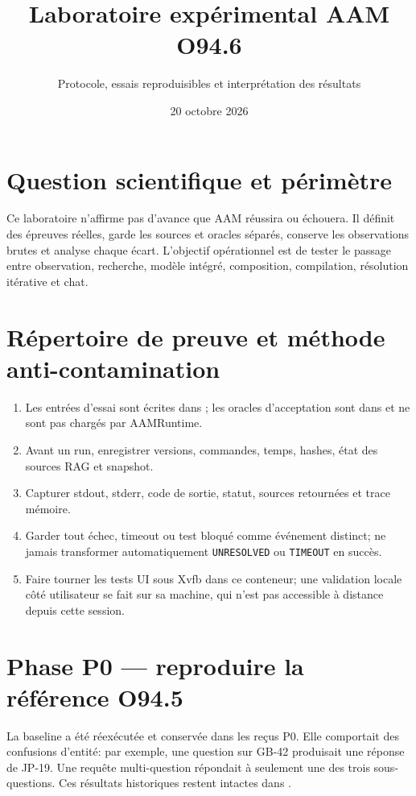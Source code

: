 \documentclass[11pt,a4paper]{article}
\title{Laboratoire expérimental AAM O94.6}
\author{Protocole, essais reproduisibles et interprétation des résultats}
\date{20 octobre 2026}
\begin{document}
\maketitle
\tableofcontents
\section{Question scientifique et périmètre}
Ce laboratoire n'affirme pas d'avance que AAM réussira ou échouera. Il définit des épreuves réelles, garde les sources et oracles séparés, conserve les observations brutes et analyse chaque écart. L'objectif opérationnel est de tester le passage entre observation, recherche, modèle intégré, composition, compilation, résolution itérative et chat.

\section{Répertoire de preuve et méthode anti-contamination}
\begin{enumerate}[leftmargin=1.5em]
\item Les entrées d'essai sont écrites dans ; les oracles d'acceptation sont dans  et ne sont pas chargés par AAMRuntime.
\item Avant un run, enregistrer versions, commandes, temps, hashes, état des sources RAG et snapshot.
\item Capturer stdout, stderr, code de sortie, statut, sources retournées et trace mémoire.
\item Garder tout échec, timeout ou test bloqué comme événement distinct; ne jamais transformer automatiquement \texttt{UNRESOLVED} ou \texttt{TIMEOUT} en succès.
\item Faire tourner les tests UI sous Xvfb dans ce conteneur; une validation locale côté utilisateur se fait sur sa machine, qui n'est pas accessible à distance depuis cette session.
\end{enumerate}

\section{Phase P0 — reproduire la référence O94.5}
La baseline a été réexécutée et conservée dans les reçus P0. Elle comportait des confusions d'entité: par exemple, une question sur GB-42 produisait une réponse de JP-19. Une requête multi-question répondait à seulement une des trois sous-questions. Ces résultats historiques restent intactes dans .
\end{document}
